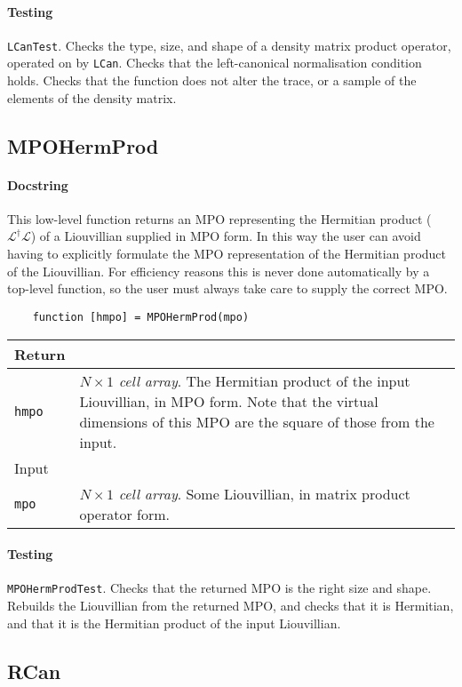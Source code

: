 \paragraph{Testing} \lstinline$LCanTest$. Checks the type, size, and shape of a density matrix product operator, operated on by \lstinline$LCan$. Checks that the left-canonical normalisation condition holds. Checks that the function does not alter the trace, or a sample of the elements of the density matrix. 
 
 \subsection{MPOHermProd}
 \paragraph{Docstring} This low-level function returns an MPO representing the Hermitian product (\(\mathcal{L}^{\dagger}\mathcal{L}\)) of a Liouvillian supplied in MPO form. In this way the user can avoid having to explicitly formulate the MPO representation of the Hermitian product of the Liouvillian. For efficiency reasons this is never done automatically by a top-level function, so the user must always take care to supply the correct MPO.
 \begin{lstlisting}
 	function [hmpo] = MPOHermProd(mpo) \end{lstlisting}
 \begin{longtabu}{X[1,1]X[4,1]}
 \hline
 Return & \\ \hline
 \lstinline$hmpo$ & \emph{\(N \times 1\) cell array}. The Hermitian product of the input Liouvillian, in MPO form. Note that the virtual dimensions of this MPO are the square of those from the input. \\ \hline
 Input & \\ \hline
 \lstinline$mpo$ & \emph{\(N \times 1\) cell array}. Some Liouvillian, in matrix product operator form. \\ 
 \hline
 \end{longtabu}
 \paragraph{Testing} \lstinline$MPOHermProdTest$. Checks that the returned MPO is the right size and shape. Rebuilds the Liouvillian from the returned MPO, and checks that it is Hermitian, and that it is the Hermitian product of the input Liouvillian. 
 
 \subsection{RCan}
